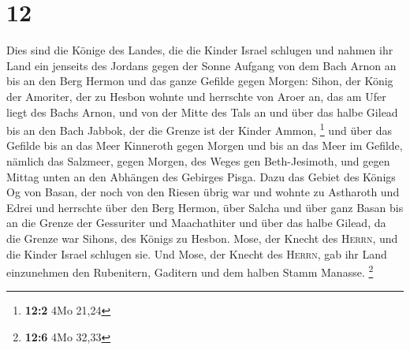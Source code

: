 \hypertarget{section-4}{%
\section{12}\label{section-4}}

 Dies sind die Könige des Landes, die die Kinder Israel
schlugen und nahmen ihr Land ein jenseits des Jordans gegen der Sonne
Aufgang von dem Bach Arnon an bis an den Berg Hermon und das ganze
Gefilde gegen Morgen:  Sihon, der König der Amoriter, der
zu Hesbon wohnte und herrschte von Aroer an, das am Ufer liegt des Bachs
Arnon, und von der Mitte des Tals an und über das halbe Gilead bis an
den Bach Jabbok, der die Grenze ist der Kinder Ammon, \footnote{\textbf{12:2}
  4Mo 21,24}  und über das Gefilde bis an das Meer
Kinneroth gegen Morgen und bis an das Meer im Gefilde, nämlich das
Salzmeer, gegen Morgen, des Weges gen Beth-Jesimoth, und gegen Mittag
unten an den Abhängen des Gebirges Pisga.  Dazu das Gebiet
des Königs Og von Basan, der noch von den Riesen übrig war und wohnte zu
Astharoth und Edrei  und herrschte über den Berg Hermon,
über Salcha und über ganz Basan bis an die Grenze der Gessuriter und
Maachathiter und über das halbe Gilead, da die Grenze war Sihons, des
Königs zu Hesbon.  Mose, der Knecht des \textsc{Herrn},
und die Kinder Israel schlugen sie. Und Mose, der Knecht des
\textsc{Herrn}, gab ihr Land einzunehmen den Rubenitern, Gaditern und
dem halben Stamm Manasse. \footnote{\textbf{12:6} 4Mo 32,33}


